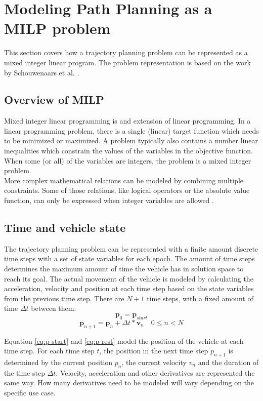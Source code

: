 \section{Modeling Path Planning as a MILP problem}
This section covers how a trajectory planning problem can be represented as a mixed integer linear program. The problem representation is based on the work by Schouwenaars et al. \cite{Schouwenaars2001}.
\subsection{Overview of MILP}
\label{subsec:previous}
Mixed integer linear programming is and extension of linear programming. In a linear programming problem, there is a single (linear) target function which needs to be minimized or maximized. A problem typically also contains a number linear inequalities which constrain the values of the variables in the objective function. When some (or all) of the variables are integers, the problem is a mixed integer problem. \\
More complex mathematical relations can be modeled by combining multiple constraints. Some of those relations, like logical operators or the absolute value function, can only be expressed when integer variables are allowed \cite{Mitra1994}.

\subsection{Time and vehicle state}
\label{section:modeling}

The trajectory planning problem can be represented with a finite amount discrete time steps with a set of state variables for each epoch. The amount of time steps determines the maximum amount of time the vehicle has in solution space to reach its goal. The actual movement of the vehicle is modeled by calculating the acceleration, velocity and position at each time step based on the state variables from the previous time step. There are $N + 1$ time steps, with a fixed amount of time $\Delta t$ between them.
\begin{equation}
\label{eq:p-start}
\boldsymbol{p}_0 = \boldsymbol{p}_{start}
\end{equation}
\begin{equation}
\label{eq:p-rest}
\boldsymbol{p}_{n+1} = \boldsymbol{p}_{n} + \Delta t * \boldsymbol{v}_{n}  \quad 0 \leq n < N
\end{equation}

Equation \ref{eq:p-start} and \ref{eq:p-rest} model the position of the vehicle at each time step. For each time step $t$, the position in the next time step $p_{n+1}$ is determined by the current position $p_n$, the current velocity $v_n$ and the duration of the time step $\Delta t$. Velocity, acceleration and other derivatives are represented the same way. How many derivatives need to be modeled will vary depending on the specific use case.

